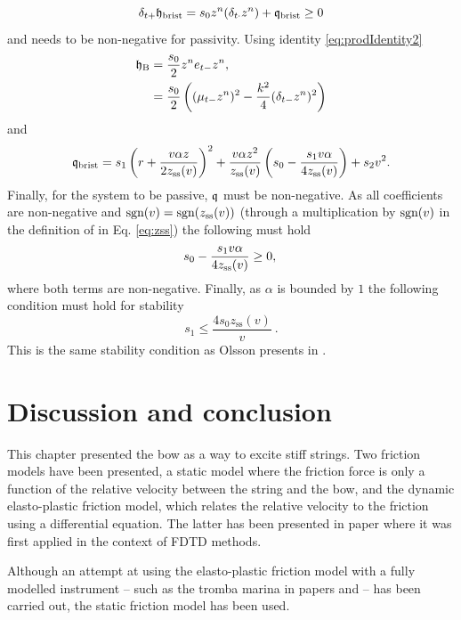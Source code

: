 \begin{equation*}
    \delta_{t+} \mathfrak{h}_\text{brist} = s_0 z^n(\delta_{t\cdot} z^n) + \mathfrak{q}_\text{brist} \geq 0
\end{equation*}
and needs to be non-negative for passivity. Using identity \eqref{eq:prodIdentity2}
\begin{align*}
    \mathfrak{h}_\text{B} &= \frac{s_0}{2} z^ne_{t-}z^n,\\
    & = \frac{s_0}{2}\left((\mu_{t-} z^n)^2 - \frac{k^2}{4}(\delta_{t-} z^n)^2\right)
\end{align*}
and 
\begin{equation}
    \mathfrak{q}_\text{brist} = s_1\left(r+\frac{v\alpha z}{2z_\text{ss}(v)}\right)^2+\frac{v\alpha z^2}{z_\text{ss}(v)}\left(s_0-\frac{s_1v\alpha}{4z_\text{ss}(v)}\right)+s_2v^2.
\end{equation}
Finally, for the system to be passive, $\mathfrak{q}$ must be non-negative. As all coefficients are non-negative and $\text{sgn}(v) = \text{sgn}(z_\text{ss}(v))$ (through a multiplication by $\text{sgn}(v)$ in the definition of in Eq. \eqref{eq:zss}) the following must hold
\begin{equation*}
    s_0-\frac{s_1v\alpha}{4z_\text{ss}(v)} \geq 0,\\
\end{equation*}
where both terms are non-negative. Finally, as $\alpha$ is bounded by $1$ the following condition must hold for stability
\begin{equation}
    s_1 \leq \frac{4s_0z_\text{ss}(v)}{v}\ .
\end{equation}
This is the same stability condition as Olsson presents in \cite{Olsson1996}. 

\section{Discussion and conclusion}
This chapter presented the bow as a way to excite stiff strings. Two friction models have been presented, a static model where the friction force is only a function of the relative velocity between the string and the bow, and the dynamic elasto-plastic friction model, which relates the relative velocity to the friction using a differential equation. The latter has been presented in paper \citeP[C] where it was first applied in the context of FDTD methods. 

Although an attempt at using the elasto-plastic friction model with a fully modelled instrument -- such as the tromba marina in papers \citeP[D] and \citeP[E] -- has been carried out, the static friction model has been used. 

